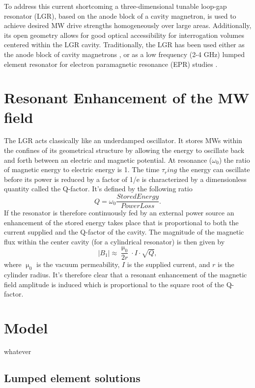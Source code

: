 To address this current shortcoming a three-dimensional tunable loop-gap resonator (LGR), based on the anode block of a cavity magnetron, is used to achieve desired MW drive strengths homogeneously over large areas. Additionally, its open geometry allows for good optical accessibility for interrogation volumes centered within the LGR cavity. Traditionally, the LGR has been used either as the anode block of cavity magnetrons \cite{}, or as a low frequency (2-4 GHz) lumped element resonator for electron paramagnetic resonance (EPR) studies \cite{}.  

\section{Resonant Enhancement of the MW field}

The LGR acts classically like an underdamped oscillator. It stores MWs within the confines of its geometrical structure by allowing the energy to oscillate back and forth between an electric and magnetic potential. At resonance ($\omega_0$) the ratio of magnetic energy to electric energy is 1. The time $\tau_ring$ the energy can oscillate before its power is reduced by a factor of 1/e is characterized by a dimensionless quantity called the Q-factor. It's defined by the following ratio
\begin{equation}
Q = \omega_0 \frac{Stored Energy}{Power Loss}.
\end{equation}
If the resonator is therefore continuously fed by an external power source an enhancement of the stored energy takes place that is proportional to both the current supplied and the Q-factor of the cavity. The magnitude of the magnetic flux within the center cavity (for a cylindrical resonator) is then given by
\begin{equation}
|B_1| \approx  \frac{\upmu_0}{2 r} \cdot I \cdot \sqrt{Q},
\end{equation}
where $\upmu_0$ is the vacuum permeability, $I$ is the supplied current, and $r$ is the cylinder radius. It's therefore clear that a resonant enhancement of the magnetic field amplitude is induced which is proportional to the square root of the Q-factor. 


\section{Model}

whatever

\subsection{Lumped element solutions} \label{circuit}

